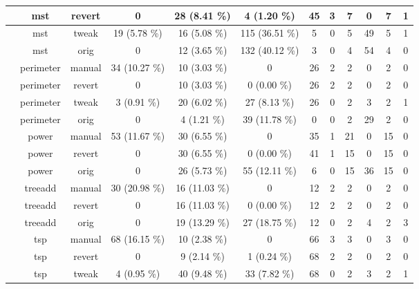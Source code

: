 \begin{tabular}{||c c c c c c c c c c c c||}
\hline
\rowcolor{white}
 & mst & revert & {\color{gray} 0} & 28 (8.41 \%) & 4 (1.20 \%) & 45 & 3 & 7 & 0 & 7 & 1 \\
\hline
\rowcolor{white}
 & mst & tweak & 19 (5.78 \%) & 16 (5.08 \%) & 115 (36.51 \%) & 5 & 0 & 5 & 49 & 5 & 1 \\
\hline
\rowcolor{white}
 & mst & orig & {\color{gray} 0} & 12 (3.65 \%) & 132 (40.12 \%) & 3 & 0 & 4 & 54 & 4 & 0 \\
\hline
\rowcolor[rgb]{0.8,0.8,0.8}
 & perimeter & manual & 34 (10.27 \%) & 10 (3.03 \%) & {\color{gray} 0} & 26 & 2 & 2 & 0 & 2 & 0 \\
\hline
\rowcolor[rgb]{0.8,0.8,0.8}
 & perimeter & revert & {\color{gray} 0} & 10 (3.03 \%) & 0 (0.00 \%) & 26 & 2 & 2 & 0 & 2 & 0 \\
\hline
\rowcolor[rgb]{0.8,0.8,0.8}
 & perimeter & tweak & 3 (0.91 \%) & 20 (6.02 \%) & 27 (8.13 \%) & 26 & 0 & 2 & 3 & 2 & 1 \\
\hline
\rowcolor[rgb]{0.8,0.8,0.8}
 & perimeter & orig & {\color{gray} 0} & 4 (1.21 \%) & 39 (11.78 \%) & 0 & 0 & 2 & 29 & 2 & 0 \\
\hline
\rowcolor{white}
 & power & manual & 53 (11.67 \%) & 30 (6.55 \%) & {\color{gray} 0} & 35 & 1 & 21 & 0 & 15 & 0 \\
\hline
\rowcolor{white}
 & power & revert & {\color{gray} 0} & 30 (6.55 \%) & 0 (0.00 \%) & 41 & 1 & 15 & 0 & 15 & 0 \\
\hline
\rowcolor{white}
 & power & orig & {\color{gray} 0} & 26 (5.73 \%) & 55 (12.11 \%) & 6 & 0 & 15 & 36 & 15 & 0 \\
\hline
\rowcolor[rgb]{0.8,0.8,0.8}
 & treeadd & manual & 30 (20.98 \%) & 16 (11.03 \%) & {\color{gray} 0} & 12 & 2 & 2 & 0 & 2 & 0 \\
\hline
\rowcolor[rgb]{0.8,0.8,0.8}
 & treeadd & revert & {\color{gray} 0} & 16 (11.03 \%) & 0 (0.00 \%) & 12 & 2 & 2 & 0 & 2 & 0 \\
\hline
\rowcolor[rgb]{0.8,0.8,0.8}
 & treeadd & orig & {\color{gray} 0} & 19 (13.29 \%) & 27 (18.75 \%) & 12 & 0 & 2 & 4 & 2 & 3 \\
\hline
\rowcolor{white}
 & tsp & manual & 68 (16.15 \%) & 10 (2.38 \%) & {\color{gray} 0} & 66 & 3 & 3 & 0 & 3 & 0 \\
\hline
\rowcolor{white}
 & tsp & revert & {\color{gray} 0} & 9 (2.14 \%) & 1 (0.24 \%) & 68 & 2 & 2 & 0 & 2 & 0 \\
\hline
\rowcolor{white}
 & tsp & tweak & 4 (0.95 \%) & 40 (9.48 \%) & 33 (7.82 \%) & 68 & 0 & 2 & 3 & 2 & 1 \\

\end{tabular}
